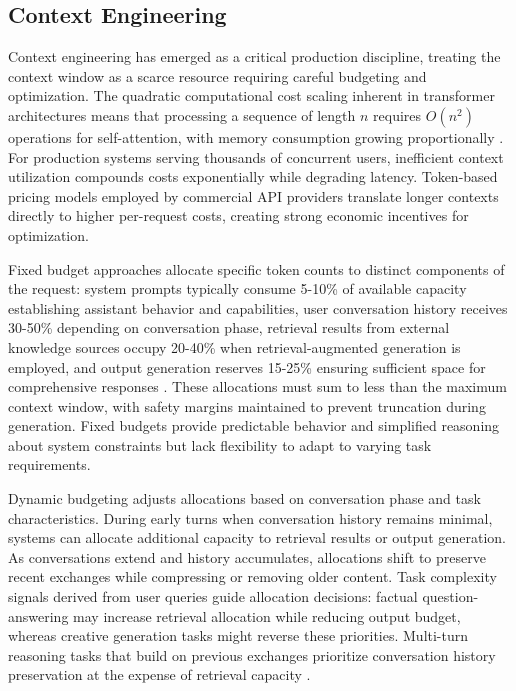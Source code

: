 \documentclass[11pt,letterpaper]{article}
\begin{document}
\subsection{Context Engineering}

Context engineering has emerged as a critical production discipline, treating the context window as a scarce resource requiring careful budgeting and optimization. The quadratic computational cost scaling inherent in transformer architectures means that processing a sequence of length $n$ requires $O(n^2)$ operations for self-attention, with memory consumption growing proportionally \cite{vaswani2017attention}. For production systems serving thousands of concurrent users, inefficient context utilization compounds costs exponentially while degrading latency. Token-based pricing models employed by commercial API providers translate longer contexts directly to higher per-request costs, creating strong economic incentives for optimization.

Fixed budget approaches allocate specific token counts to distinct components of the request: system prompts typically consume 5-10\% of available capacity establishing assistant behavior and capabilities, user conversation history receives 30-50\% depending on conversation phase, retrieval results from external knowledge sources occupy 20-40\% when retrieval-augmented generation is employed, and output generation reserves 15-25\% ensuring sufficient space for comprehensive responses \cite{factory2024budgeting}. These allocations must sum to less than the maximum context window, with safety margins maintained to prevent truncation during generation. Fixed budgets provide predictable behavior and simplified reasoning about system constraints but lack flexibility to adapt to varying task requirements.

Dynamic budgeting adjusts allocations based on conversation phase and task characteristics. During early turns when conversation history remains minimal, systems can allocate additional capacity to retrieval results or output generation. As conversations extend and history accumulates, allocations shift to preserve recent exchanges while compressing or removing older content. Task complexity signals derived from user queries guide allocation decisions: factual question-answering may increase retrieval allocation while reducing output budget, whereas creative generation tasks might reverse these priorities. Multi-turn reasoning tasks that build on previous exchanges prioritize conversation history preservation at the expense of retrieval capacity \cite{kim2024budget}.
\end{document}
